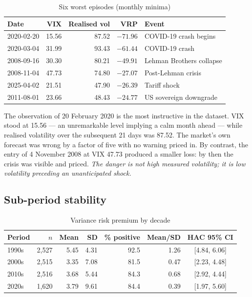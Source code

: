 \documentclass[11pt,a4paper]{article}
\begin{document}
\begin{table}[h]
\centering
\caption{Six worst episodes (monthly minima)}
\begin{tabular}{@{}lrrrl@{}}
\toprule
Date & VIX & Realised vol & VRP & Event \\
\midrule
2020-02-20 & 15.56 & 87.52 & $-71.96$ & COVID-19 crash begins \\
2020-03-04 & 31.99 & 93.43 & $-61.44$ & COVID-19 crash \\
2008-09-16 & 30.30 & 80.21 & $-49.91$ & Lehman Brothers collapse \\
2008-11-04 & 47.73 & 74.80 & $-27.07$ & Post-Lehman crisis \\
2025-04-02 & 21.51 & 47.90 & $-26.39$ & Tariff shock \\
2011-08-01 & 23.66 & 48.43 & $-24.77$ & US sovereign downgrade \\
\bottomrule
\end{tabular}
\end{table}

The observation of 20 February 2020 is the most instructive in the dataset. VIX stood at 15.56 --- an
unremarkable level implying a calm month ahead --- while realised volatility over the subsequent 21
days was 87.52. The market's own forecast was wrong by a factor of five with no warning priced in.
By contrast, the entry of 4 November 2008 at VIX 47.73 produced a smaller loss: by then the crisis was
visible and priced. \emph{The danger is not high measured volatility; it is low volatility preceding
an unanticipated shock.}

\subsection{Sub-period stability}

\begin{table}[h]
\centering
\caption{Variance risk premium by decade}
\begin{tabular}{@{}lrrrrrc@{}}
\toprule
Period & $n$ & Mean & SD & \% positive & Mean/SD & HAC 95\% CI \\
\midrule
1990s & 2,527 & 5.45 & 4.31 & 92.5 & 1.26 & [4.84, 6.06] \\
2000s & 2,515 & 3.35 & 7.08 & 81.5 & 0.47 & [2.23, 4.48] \\
2010s & 2,516 & 3.68 & 5.44 & 84.3 & 0.68 & [2.92, 4.44] \\
2020s & 1,620 & 3.79 & 9.61 & 84.4 & 0.39 & [1.97, 5.60] \\
\bottomrule
\end{tabular}
\end{table}
\end{document}
